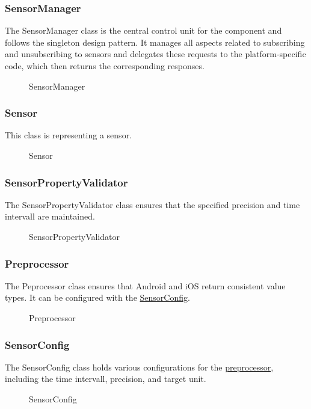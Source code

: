 \documentclass[12pt]{article}
\begin{document}
\subsubsection{SensorManager}
\label{sec:SensorManager}
The SensorManager class is the central control unit for the component and follows the singleton design pattern. It manages all aspects related to subscribing and unsubscribing to sensors and delegates these requests to the platform-specific code, which then returns the corresponding responses.
\begin{figure}[ht]
\centering

\caption{\label{fig:bild21} SensorManager}
\end{figure}

\subsubsection{Sensor}
\label{sec:Sensor}
This class is representing a sensor.
\begin{figure}[ht]
\centering

\caption{\label{fig:bild22} Sensor}
\end{figure}
\newpage

\subsubsection{SensorPropertyValidator}
\label{sec:SensorPropertyValidator}
The SensorPropertyValidator class ensures that the specified precision and time intervall are maintained.
\begin{figure}[ht]
\centering

\caption{\label{fig:bild23} SensorPropertyValidator}
\end{figure}


\subsubsection{Preprocessor}
\label{sec:Preprocessor}
The Peprocessor class ensures that Android and iOS return consistent value types. It can be configured with the \hyperref[sec:SensorConfig]{SensorConfig}.
\begin{figure}[ht]
\centering

\caption{\label{fig:bild24} Preprocessor}
\end{figure}
\newpage
\subsubsection{SensorConfig}
\label{sec:SensorConfig}
The SensorConfig class holds various configurations for the \hyperref[sec:Preprocessor]{preprocessor}, including the time intervall, precision, and target unit.
\begin{figure}[ht]
\centering

\caption{\label{fig:bild25} SensorConfig}
\end{figure}
\end{document}
